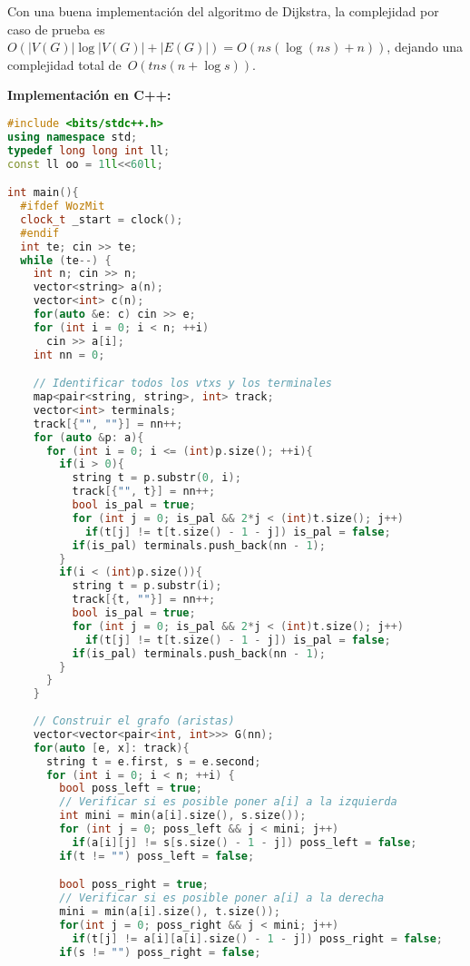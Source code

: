 Con una buena implementación del algoritmo de Dijkstra, la complejidad por caso de
prueba es~$O(|V(G)|\log |V(G)| + |E(G)|) = O(ns(\log(ns) + n))$, dejando una
complejidad total de~$O(tns(n + \log s))$.

\textbf{Implementación en C++:}

\begin{lstlisting}[language=C++]
#include <bits/stdc++.h>
using namespace std;
typedef long long int ll;
const ll oo = 1ll<<60ll;

int main(){
  #ifdef WozMit
  clock_t _start = clock();
  #endif
  int te; cin >> te;
  while (te--) {
    int n; cin >> n;
    vector<string> a(n);
    vector<int> c(n);
    for(auto &e: c) cin >> e;
    for (int i = 0; i < n; ++i)
      cin >> a[i];
    int nn = 0;

    // Identificar todos los vtxs y los terminales
    map<pair<string, string>, int> track;
    vector<int> terminals;
    track[{"", ""}] = nn++;
    for (auto &p: a){
      for (int i = 0; i <= (int)p.size(); ++i){
        if(i > 0){
          string t = p.substr(0, i);
          track[{"", t}] = nn++;
          bool is_pal = true;
          for (int j = 0; is_pal && 2*j < (int)t.size(); j++)
            if(t[j] != t[t.size() - 1 - j]) is_pal = false;
          if(is_pal) terminals.push_back(nn - 1);
        }
        if(i < (int)p.size()){
          string t = p.substr(i);
          track[{t, ""}] = nn++;
          bool is_pal = true;
          for (int j = 0; is_pal && 2*j < (int)t.size(); j++)
            if(t[j] != t[t.size() - 1 - j]) is_pal = false;
          if(is_pal) terminals.push_back(nn - 1);
        }
      }
    }
  
    // Construir el grafo (aristas)
    vector<vector<pair<int, int>>> G(nn);
    for(auto [e, x]: track){
      string t = e.first, s = e.second;
      for (int i = 0; i < n; ++i) {
        bool poss_left = true;
        // Verificar si es posible poner a[i] a la izquierda
        int mini = min(a[i].size(), s.size());
        for (int j = 0; poss_left && j < mini; j++)
          if(a[i][j] != s[s.size() - 1 - j]) poss_left = false;
        if(t != "") poss_left = false;

        bool poss_right = true;
        // Verificar si es posible poner a[i] a la derecha
        mini = min(a[i].size(), t.size());
        for(int j = 0; poss_right && j < mini; j++)
          if(t[j] != a[i][a[i].size() - 1 - j]) poss_right = false;
        if(s != "") poss_right = false;


\end{lstlisting}
